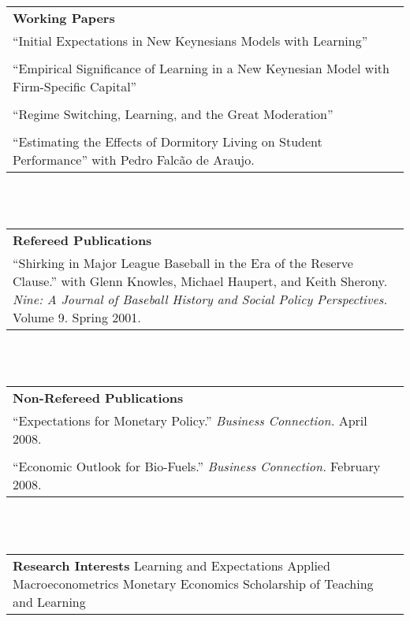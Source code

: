 \documentclass[12pt,notitlepage,oneside]{book}
\begin{document}
\begin{singlespace}
\begin{tabular}{p{5.5in}}
\textbf{Working Papers} \\
``Initial Expectations in New Keynesians Models with Learning''\\\\
``Empirical Significance of Learning in a New Keynesian Model with Firm-Specific Capital''\\\\
``Regime Switching, Learning, and the Great Moderation'' \\\\
``Estimating the Effects of Dormitory Living on Student Performance'' with Pedro Falc\~{a}o de Araujo.
\end{tabular} \\ \\

\begin{tabular}{p{5.5in}}
\textbf{Refereed Publications} \\
``Shirking in Major League Baseball in the Era of the Reserve Clause.'' with Glenn Knowles, Michael Haupert, and Keith Sherony. \textit{Nine: A Journal of Baseball History and Social Policy Perspectives.}  Volume 9. Spring 2001. \\
\end{tabular} \\ \\

\begin{tabular}{p{5.5in}}
\textbf{Non-Refereed Publications} \\
``Expectations for Monetary Policy.'' \textit{Business Connection.}  April 2008. \\\\
``Economic Outlook for Bio-Fuels.'' \textit{Business Connection.}  February 2008. \\
\end{tabular} \\ \\

\begin{tabular}{p{6in}}
\textbf{Research Interests}\newline 
Learning and Expectations \newline
Applied Macroeconometrics \newline
Monetary Economics \newline
Scholarship of Teaching and Learning\newline
\end{tabular} \\ 


\end{singlespace}
\end{document}
